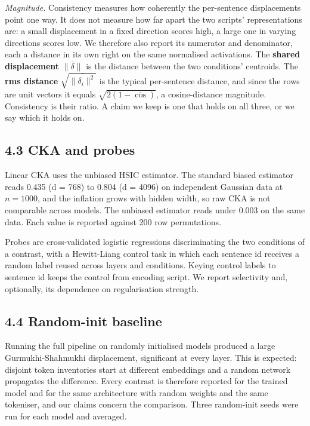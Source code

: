 \emph{Magnitude.} Consistency measures how coherently the per-sentence
displacements point one way. It does not measure how far apart the two
scripts' representations are: a small displacement in a fixed direction
scores high, a large one in varying directions scores low. We therefore
also report its numerator and denominator, each a distance in its own
right on the same normalised activations. The \textbf{shared
displacement} \(\lVert \overline{\delta} \rVert\) is the distance
between the two conditions' centroids. The \textbf{rms distance}
\(\sqrt{\overline{\lVert\delta_i\rVert^2}}\) is the typical per-sentence
distance, and since the rows are unit vectors it equals
\(\sqrt{2(1-\overline{\cos})}\), a cosine-distance magnitude.
Consistency is their ratio. A claim we keep is one that holds on all
three, or we say which it holds on.

\hypertarget{cka-and-probes}{%
\subsection{4.3 CKA and probes}\label{cka-and-probes}}

Linear CKA uses the unbiased HSIC estimator. The standard biased
estimator reads 0.435 (d = 768) to 0.804 (d = 4096) on independent
Gaussian data at \(n = 1000\), and the inflation grows with hidden
width, so raw CKA is not comparable across models. The unbiased
estimator reads under 0.003 on the same data. Each value is reported
against 200 row permutations.

Probes are cross-validated logistic regressions discriminating the two
conditions of a contrast, with a Hewitt-Liang control task in which each
sentence id receives a random label reused across layers and conditions.
Keying control labels to sentence id keeps the control from encoding
script. We report selectivity and, optionally, its dependence on
regularisation strength.

\hypertarget{random-init-baseline}{%
\subsection{4.4 Random-init baseline}\label{random-init-baseline}}

Running the full pipeline on randomly initialised models produced a
large Gurmukhi-Shahmukhi displacement, significant at every layer. This
is expected: disjoint token inventories start at different embeddings
and a random network propagates the difference. Every contrast is
therefore reported for the trained model and for the same architecture
with random weights and the same tokeniser, and our claims concern the
comparison. Three random-init seeds were run for each model and
averaged.

